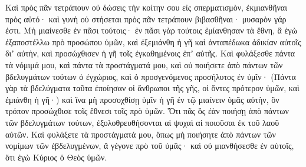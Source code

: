 {Καὶ πρὸς πᾶν τετράπουν οὐ δώσεις τὴν κοίτην σου εἰς σπερματισμὸν, ἐκμιανθῆναι πρὸς αὐτό· καὶ γυνὴ οὐ στήσεται πρὸς πᾶν τετράπουν βιβασθῆναι· μυσαρὸν γάρ ἐστι.
Μὴ μιαίνεσθε ἐν πᾶσι τούτοις· ἐν πᾶσι γὰρ τούτοις ἐμίανθησαν τὰ ἔθνη, ἃ ἐγὼ ἐξαποστέλλω πρὸ προσώπου ὑμῶν,
καὶ ἐξεμιάνθη ἡ γῆ καὶ ἀνταπέδωκα ἀδικίαν αὐτοῖς διʼ αὐτὴν, καὶ προσώχθισεν ἡ γῆ τοῖς ἐγκαθημένοις ἐπʼ αὐτῆς.
Καὶ φυλάξεσθε πάντα τὰ νόμιμά μου, καὶ πάντα τὰ προστάγματά μου, καὶ οὐ ποιήσετε ἀπὸ πάντων τῶν βδελυγμάτων τούτων ὁ ἐγχώριος, καὶ ὁ προσγενόμενος προσήλυτος ἐν ὑμῖν·
(Πάντα γὰρ τὰ βδελύγματα ταῦτα ἐποίησαν οἱ ἄνθρωποι τῆς γῆς, οἱ ὄντες πρότερον ὑμῶν, καὶ ἐμιάνθη ἡ γῆ·)
καὶ ἵνα μὴ προσοχθίσῃ ὑμῖν ἡ γῆ ἐν τῷ μιαίνειν ὑμᾶς αὐτὴν, ὃν τρόπον προσώχθισε τοῖς ἔθνεσι τοῖς πρὸ ὑμῶν.
Ὅτι πᾶς ὃς ἐὰν ποιήσῃ ἀπὸ πάντων τῶν βδελυγμάτων τούτων, ἐξολοθρευθήσονται αἱ ψυχαὶ αἱ ποιοῦσαι ἐκ τοῦ λαοῦ αὐτῶν.
Καὶ φυλάξετε τὰ προστάγματά μου, ὅπως μὴ ποιήσητε ἀπὸ πάντων τῶν νομίμων τῶν ἐβδελυγμένων, ἃ γέγονε πρὸ τοῦ ὑμᾶς· καὶ οὐ μιανθήσεσθε ἐν αὐτοῖς, ὅτι ἐγὼ Κύριος ὁ Θεὸς ὑμῶν.

}

